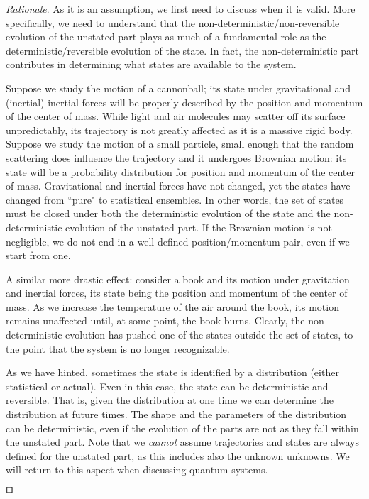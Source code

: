 \documentclass[smallextended]{svjour3}
\numberwithin{equation}{section}
\newenvironment{rationale}{\emph{Rationale}.}{\hfill\(\qed\)}
\theoremstyle{definition}
\newenvironment{rationale}{\emph{Rationale}.}{\qed}
\begin{document}
\begin{rationale}
As it is an assumption, we first need to discuss when it is valid. More specifically, we need to understand that the non-deterministic/non-reversible evolution of the unstated part plays as much of a fundamental role as the deterministic/reversible evolution of the state. In fact, the non-deterministic part contributes in determining what states are available to the system.

Suppose we study the motion of a cannonball; its state under gravitational and (inertial) inertial forces will be properly described by the position and momentum of the center of mass. While light and air molecules may scatter off its surface unpredictably, its trajectory is not greatly affected as it is a massive rigid body. Suppose we study the motion of a small particle, small enough that the random scattering does influence the trajectory and it undergoes Brownian motion: its state will be a probability distribution for position and momentum of the center of mass. Gravitational and inertial forces have not changed, yet the states have changed from ``pure" to statistical ensembles. In other words, the set of states must be closed under both the deterministic evolution of the state and the non-deterministic evolution of the unstated part. If the Brownian motion is not negligible, we do not end in a well defined position/momentum pair, even if we start from one.

A similar more drastic effect: consider a book and its motion under gravitation and inertial forces, its state being the position and momentum of the center of mass. As we increase the temperature of the air around the book, its motion remains unaffected until, at some point, the book burns. Clearly, the non-deterministic evolution has pushed one of the states outside the set of states, to the point that the system is no longer recognizable.

As we have hinted, sometimes the state is identified by a distribution (either statistical or actual). Even in this case, the state can be deterministic and reversible. That is, given the distribution at one time we can determine the distribution at future times. The shape and the parameters of the distribution can be deterministic, even if the evolution of the parts are not as they fall within the unstated part. Note that we \emph{cannot} assume trajectories and states are always defined for the unstated part, as this includes also the unknown unknowns. We will return to this aspect when discussing quantum systems.


\end{rationale}
\end{document}
